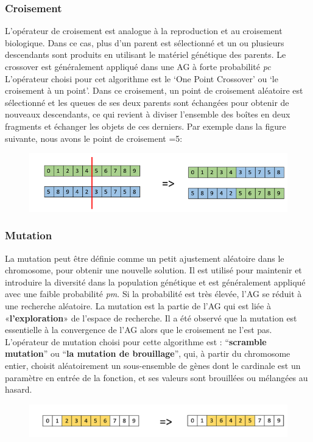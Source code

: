 \documentclass{article}
\begin{document}
\subsubsection{Croisement}
L'opérateur de croisement est analogue à la reproduction et au croisement biologique. Dans ce cas, plus d'un parent est sélectionné et un ou plusieurs descendants sont produits en utilisant le matériel génétique des parents. Le crossover est généralement appliqué dans une AG à forte probabilité \textit{pc}
\newline
L’opérateur choisi pour cet algorithme est le ‘One Point Crossover’ ou ‘le croisement à un point’. Dans ce croisement, un point de croisement aléatoire est sélectionné et les queues de ses deux parents sont échangées pour obtenir de nouveaux descendants, ce qui revient à diviser l’ensemble des boîtes en deux fragments et échanger les objets de ces derniers.
\newline
Par exemple dans la figure suivante, nous avons le point de croisement =5:
\begin{figure}[H]
  \includegraphics[width=\linewidth]{../figures/pic05.PNG}
\end{figure}
\subsubsection{Mutation}
La mutation peut être définie comme un petit ajustement aléatoire dans le chromosome, pour obtenir une nouvelle solution. Il est utilisé pour maintenir et introduire la diversité dans la population génétique et est généralement appliqué avec une faible probabilité \textit{pm}. Si la probabilité est très élevée, l'AG se réduit à une recherche aléatoire.
\newline
La mutation est la partie de l'AG qui est liée à «\textbf{l'exploration}» de l'espace de recherche. Il a été observé que la mutation est essentielle à la convergence de l'AG alors que le croisement ne l'est pas.
\newline
L’opérateur de mutation choisi pour cette algorithme est :  “\textbf{scramble mutation}” ou “\textbf{la mutation de brouillage}”, qui, à partir du chromosome entier, choisit aléatoirement un sous-ensemble de gènes dont le cardinale est un paramètre en entrée de la fonction, et ses valeurs sont brouillées ou mélangées au hasard.
\begin{figure}[H]
  \includegraphics[width=\linewidth]{../figures/pic06.PNG}
\end{figure}
\end{document}
